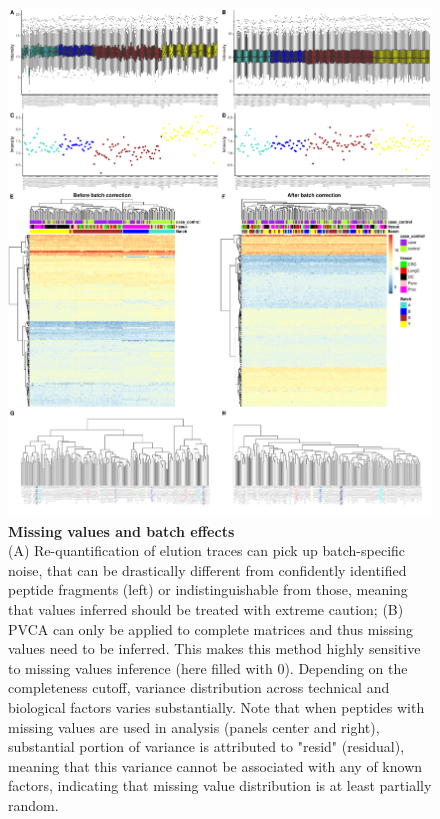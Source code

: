 \documentclass[num-refs]{wiley-article}
\begin{document}
\begin{figure}
	\includegraphics[width=\textwidth]{figures/Supp_Fig2_PanCancer}
	
	\caption{\textbf{Missing values and batch effects} \\
		\footnotesize (A) Re-quantification of elution traces can pick up batch-specific noise, that can be drastically different from confidently identified peptide fragments (left) or indistinguishable from those, meaning that values inferred should be treated with extreme caution; (B) PVCA can only be applied to complete matrices and thus missing values need to be inferred. This makes this method highly sensitive to missing values inference (here filled with 0). Depending on the completeness cutoff, variance distribution across technical and biological factors varies substantially. Note that when peptides with missing values are used in analysis (panels center and right), substantial portion of variance is attributed to "resid" (residual), meaning that this variance cannot be associated with any of known factors, indicating that missing value distribution is at least partially random.}
	\label{fig:batch_figS4_missing_values}
\end{figure}
\end{document}
